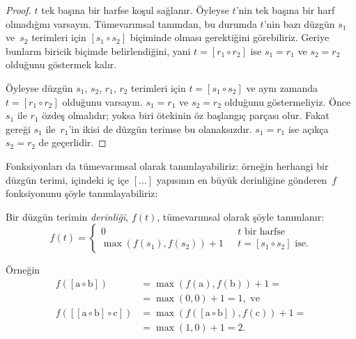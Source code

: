 \begin{proof}
  $t$ tek başına bir harfse koşul sağlanır. Öyleyse $t$'nin tek başına
  bir harf olmadığını varsayın. Tümevarımsal tanımdan, bu durumda
  $t$'nin bazı düzgün $s_1$ ve~$s_2$ terimleri için $[s_1 \circ s_2]$
  biçiminde olması gerektiğini görebiliriz. Geriye bunların biricik biçimde
  belirlendiğini, yani $t = [r_1 \circ r_2]$ ise $s_1 = r_1$ ve $s_2 =
  r_2$ olduğunu göstermek kalır.

  Öyleyse düzgün $s_1$, $s_2$, $r_1$, $r_2$ terimleri için $t = [s_1
  \circ s_2]$ ve aynı zamanda $t = [r_1 \circ r_2]$ olduğunu varsayın.
  $s_1 = r_1$ ve $s_2 = r_2$ olduğunu göstermeliyiz. Önce $s_1$ ile
  $r_1$ özdeş olmalıdır; yoksa biri ötekinin öz başlangıç parçası olur.
  Fakat  gereği $s_1$ ile~$r_1$'in ikisi de
  düzgün terimse bu olanaksızdır. $s_1 = r_1$ ise açıkça $s_2 = r_2$ de
  geçerlidir.
\end{proof}

Fonksiyonları da tümevarımsal olarak tanımlayabiliriz: örneğin herhangi
bir düzgün terimi, içindeki iç içe $[\dots]$ yapısının en büyük
derinliğine gönderen~$f$ fonksiyonunu şöyle tanımlayabiliriz:

\begin{defn}
   Bir düzgün terimin \emph{derinliği}, $f(t)$,
  tümevarımsal olarak şöyle tanımlanır:
  \[
  f(t) = \begin{cases}
    0 & \text{ $t$ bir harfse}\\
    \max(f(s_1), f(s_2)) + 1 & \text{ $t = [s_1 \circ s_2]$ ise.}
  \end{cases}
  \]
\end{defn}

Örneğin
\begin{align*}
  f([\mathrm{a} \circ \mathrm{b}]) & =
    \max(f(\mathrm{a}),f(\mathrm{b})) + 1 = \\
  &= \max(0, 0) + 1 = 1, \text{ ve}\\
  f([[\mathrm{a} \circ \mathrm{b}] \circ \mathrm{c}]) & =
    \max(f([\mathrm{a} \circ \mathrm{b}]), f(\mathrm{c})) + 1 = \\
  & = \max(1,0) + 1 = 2.
\end{align*}

